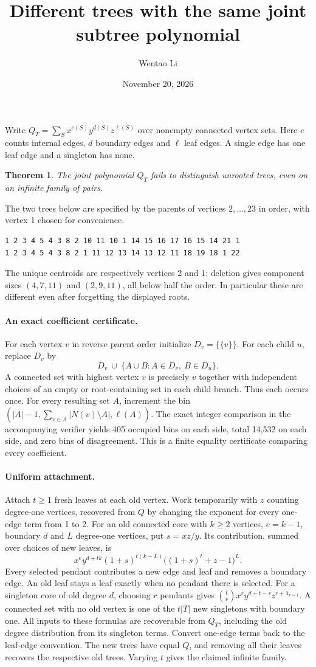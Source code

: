\documentclass[11pt]{article}
\title{Different trees with the same joint subtree polynomial}
\author{Wentao Li}
\date{November 20, 2026}
\newtheorem{theorem}{Theorem}
\begin{document}
\maketitle
Write $Q_T=\sum_S x^{e(S)}y^{d(S)}z^{\ell(S)}$ over nonempty connected vertex sets. Here $e$ counts internal edges, $d$ boundary edges and $\ell$ leaf edges. A single edge has one leaf edge and a singleton has none.
\begin{theorem}The joint polynomial $Q_T$ fails to distinguish unrooted trees, even on an infinite family of pairs.\end{theorem}
The two trees below are specified by the parents of vertices $2,\dots,23$ in order, with vertex 1 chosen for convenience.
\begin{verbatim}
1 2 3 4 5 4 3 8 2 10 11 10 1 14 15 16 17 16 15 14 21 1
1 2 3 4 5 4 3 8 2 1 11 12 13 14 13 12 11 18 19 18 1 22
\end{verbatim}
The unique centroids are respectively vertices 2 and 1: deletion gives component sizes $(4,7,11)$ and $(2,9,11)$, all below half the order. In particular these are different even after forgetting the displayed roots.
\paragraph{An exact coefficient certificate.} For each vertex $v$ in reverse parent order initialize $D_v=\{\{v\}\}$. For each child $u$, replace $D_v$ by
\[
 D_v\ \cup\ \{A\cup B:A\in D_v,\ B\in D_u\}.
\]
A connected set with highest vertex $v$ is precisely $v$ together with independent choices of an empty or root-containing set in each child branch. Thus each occurs once. For every resulting set $A$, increment the bin $(|A|-1,\sum_{v\in A}|N(v)\setminus A|,\ell(A))$. The exact integer comparison in the accompanying verifier yields 405 occupied bins on each side, total 14,532 on each side, and zero bins of disagreement. This is a finite equality certificate comparing every coefficient.
\paragraph{Uniform attachment.} Attach $t\ge1$ fresh leaves at each old vertex. Work temporarily with $z$ counting degree-one vertices, recovered from $Q$ by changing the exponent for every one-edge term from 1 to 2. For an old connected core with $k\ge2$ vertices, $e=k-1$, boundary $d$ and $L$ degree-one vertices, put $s=xz/y$. Its contribution, summed over choices of new leaves, is
\[
 x^e y^{d+tk}(1+s)^{t(k-L)}\big((1+s)^t+z-1\big)^L.
\]
Every selected pendant contributes a new edge and leaf and removes a boundary edge. An old leaf stays a leaf exactly when no pendant there is selected. For a singleton core of old degree $d$, choosing $r$ pendants gives $\binom tr x^r y^{d+t-r} z^{r+\mathbf1_{r=1}}$. A connected set with no old vertex is one of the $t|T|$ new singletons with boundary one. All inputs to these formulas are recoverable from $Q_T$, including the old degree distribution from its singleton terms. Convert one-edge terms back to the leaf-edge convention. The new trees have equal $Q$, and removing all their leaves recovers the respective old trees. Varying $t$ gives the claimed infinite family.
\end{document}
